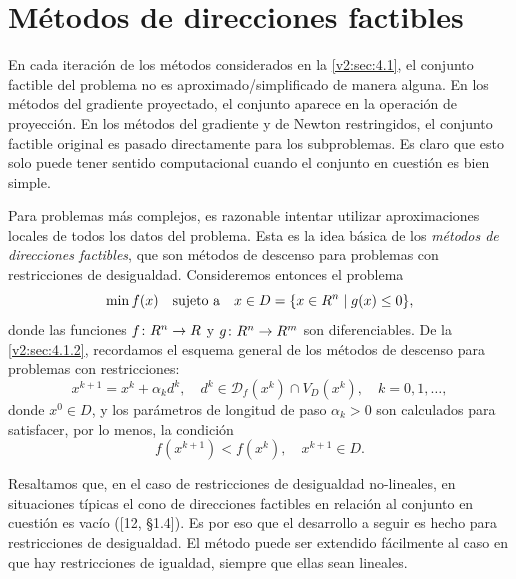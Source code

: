 
\section{Métodos de direcciones factibles}\label{v2:sec:4.2}

En cada iteración de los métodos considerados en la \cref{v2:sec:4.1}, el conjunto factible del problema no es aproximado/simplificado de manera alguna. En los métodos del gradiente proyectado, el conjunto aparece en la operación de proyección. En los métodos del gradiente y de Newton restringidos, el conjunto factible original es pasado directamente para los subproblemas. Es claro que esto solo puede tener sentido computacional cuando el conjunto en cuestión es bien simple.

Para problemas más complejos, es razonable intentar utilizar aproximaciones locales de todos los datos del problema. Esta es la idea básica de los \textit{métodos de direcciones factibles}, que son métodos de descenso para problemas con restricciones de desigualdad. Consideremos entonces el problema
\begin{equation}
    \min f(x) \quad \text{sujeto a} \quad x \in D = \{x \in R^n \mid g(x) \le 0\},
    \label{v2:eq:4.23}
\end{equation}
donde las funciones $f \colon R^n \to R$ y $g \colon R^n \to R^m$ son diferenciables. De la \cref{v2:sec:4.1.2}, recordamos el esquema general de los métodos de descenso para problemas con restricciones:
\begin{equation}
    x^{k+1} = x^k + \alpha_k d^k, \quad d^k \in \mathcal{D}_f(x^k) \cap V_D(x^k), \quad k = 0, 1, \dots,
    \label{v2:eq:4.24}
\end{equation}
donde $x^0 \in D$, y los parámetros de longitud de paso $\alpha_k > 0$ son calculados para satisfacer, por lo menos, la condición
\begin{equation}
    f(x^{k+1}) < f(x^k), \quad x^{k+1} \in D.
    \label{v2:eq:4.25}
\end{equation}

Resaltamos que, en el caso de restricciones de desigualdad no-lineales, en situaciones típicas el cono de direcciones factibles en relación al conjunto en cuestión es vacío ([12, \S 1.4]). Es por eso que el desarrollo a seguir es hecho para restricciones de desigualdad. El método puede ser extendido fácilmente al caso en que hay restricciones de igualdad, siempre que ellas sean lineales.

